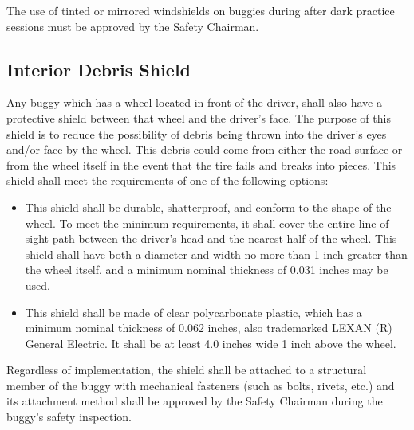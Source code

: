 	The use of tinted or mirrored windshields on buggies during after dark practice sessions must be approved by the Safety Chairman.

\subsection{Interior Debris Shield}

	Any buggy which has a wheel located in front of the driver, shall also have a protective shield between that wheel and the driver's face. The purpose of this shield is to reduce the possibility of debris being thrown into the driver's eyes and/or face by the wheel. This debris could come from either the road surface or from the wheel itself in the event that the tire fails and breaks into pieces. This shield shall meet the requirements of one of the following options:

	\begin{itemize}

		\item
		This shield shall be durable, shatterproof, and conform to the shape of the wheel. To meet the minimum requirements, it shall cover the entire line-of-sight path between the driver's head and the nearest half of the wheel. This shield shall have both a diameter and width no more than 1 inch greater than the wheel itself, and a minimum nominal thickness of 0.031 inches may be used.

		\item
		This shield shall be made of clear polycarbonate plastic, which has a minimum nominal thickness of 0.062 inches, also trademarked LEXAN (R) General Electric. It shall be at least 4.0 inches wide 1 inch above the wheel.


	\end{itemize}

	Regardless of implementation, the shield shall be attached to a structural member of the buggy with mechanical fasteners (such as bolts, rivets, etc.) and its attachment method shall be approved by the Safety Chairman during the buggy's safety inspection.
